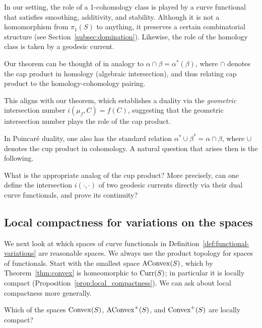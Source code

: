 In our setting, the role of a 1-cohomology class is played by a curve
functional that satisfies smoothing, additivity, and
stability. Although it is not a homomorphism from
$\pi_1(S)$ to anything, it preserves a certain combinatorial structure
(see Section~\ref{subsec:domination}). Likewise, the role of the homology
class is taken by a geodesic current.

Our theorem can be thought of in analogy to $\alpha \cap \beta =
  \alpha^*(\beta)$, where $\cap$ denotes the cap product in homology (algebraic intersection), and thus relating cap product to the homology-cohomology pairing.

  This aligns with our theorem, which establishes a duality via the \emph{geometric} intersection number $i(\mu_f, C) = f(C)$, suggesting that the geometric intersection number plays the role of the cap product. 

  
In Poincaré duality, one also has the standard relation $\alpha^* \cup \beta^* = \alpha \cap \beta$, where $\cup$ denotes the cup product in cohomology.  
A natural question that arises then is the following.

\begin{question} What is the appropriate analog of the cup product?
  More precisely, can one define the intersection $i(\cdot,\cdot)$ of
  two geodesic
  currents directly via their dual curve functionals, and prove its
  continuity?
\end{question}

\subsection{Local compactness for variations on the spaces}
\label{sec:local-compactness}

We next look at which spaces of curve functionals in
Definition~\ref{def:functional-variations}
are reasonable spaces. We always
use the product topology for spaces of functionals.
Start with the smallest space $\mathrm{AConvex}(S)$, which by
Theorem~\ref{thm:convex} is homeomorphic to $\operatorname{Curr}(S)$; in particular
it is locally compact (Proposition~\ref{prop:local_compactness}).
We can ask about local compactness more generally.

\begin{question}
  Which of the spaces $\mathrm{Convex}(S)$, $\mathrm{AConvex}^+(S)$, and
  $\mathrm{Convex}^+(S)$ are locally compact?
\end{question}


